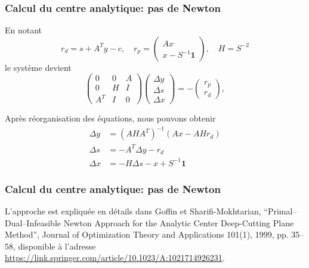 \documentclass[usepdftitle=false, aspectratio=169]{beamer}
\def\bone{\boldsymbol{1}}
\begin{document}
\begin{frame}
	\frametitle{Calcul du centre analytique: pas de Newton}

En notant	
$$
r_d = s + A^Ty - c,\quad r_p = \begin{pmatrix} Ax \\ x-S^{-1}\bone \end{pmatrix},\quad H = S^{-2}
$$
le système devient
	$$
	\begin{pmatrix}
		0 & 0 & A \\ 0 & H & I \\ A^T & I & 0
	\end{pmatrix}
\begin{pmatrix}
	\Delta y \\ \Delta s \\ \Delta x
\end{pmatrix}
	=
	-
	\begin{pmatrix}
		r_p \\ r_d
	\end{pmatrix},
	$$

\mbox{}

Après réorganisation des équations, nous pouvons obtenir
\begin{align*}
	\Delta y &= (AHA^T)^{-1} (Ax - AHr_d )\\
	\Delta s &= -A^T\Delta y - r_d \\
	\Delta x &= -H\Delta s - x + S^{-1}\bone
\end{align*}
	
\end{frame}

\begin{frame}
	\frametitle{Calcul du centre analytique: pas de Newton}
	
	
	\mbox{}
	
	L'approche est expliquée en détails dans Goffin et Sharifi-Mokhtarian, ``Primal--Dual--Infeasible Newton Approach for the Analytic Center Deep-Cutting Plane Method'', Journal of Optimization Theory and Applications 101(1), 1999, pp. 35--58, disponible à l'adresse \url{https://link.springer.com/article/10.1023/A:1021714926231}.
	
\end{frame}
\end{document}
